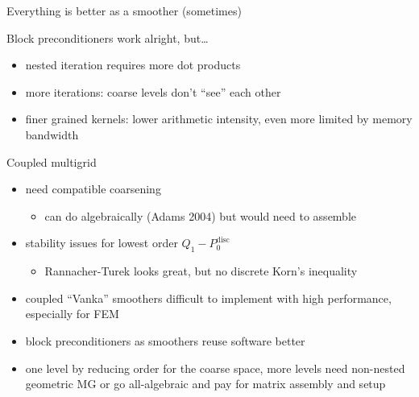 \begin{frame}[shrink=5]{Everything is better as a smoother (sometimes)}
  \begin{block}{Block preconditioners work alright, but\ldots}
    \begin{itemize}
    \item nested iteration requires more dot products
    \item more iterations: coarse levels don't ``see'' each other
    \item finer grained kernels: lower arithmetic intensity, even more limited by memory bandwidth
    \end{itemize}
  \end{block}
  \begin{block}{Coupled multigrid}
    \begin{itemize}
    \item need compatible coarsening
      \begin{itemize}
      \item can do algebraically (Adams 2004) but would need to assemble
      \end{itemize}
    \item stability issues for lowest order $Q_1-P_0^{\text{disc}}$
      \begin{itemize}
      \item Rannacher-Turek looks great, but no discrete Korn's inequality
      \end{itemize}
    \item coupled ``Vanka'' smoothers difficult to implement with high performance, especially for FEM
    \item block preconditioners as smoothers reuse software better
    \item one level by reducing order for the coarse space, more levels need non-nested geometric MG or go all-algebraic and pay for matrix assembly and setup
    \end{itemize}
  \end{block}
\end{frame}
